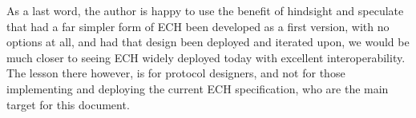 As a last word, the author is happy to use the benefit of hindsight and
speculate that had a far simpler form of ECH been developed as a first version,
with no options at all, and had that design been deployed and iterated upon, we
would be much closer to seeing ECH widely deployed today with excellent
interoperability.  The lesson there however, is for protocol designers, and not
for those implementing and deploying the current ECH specification, who are the
main target for this document.
